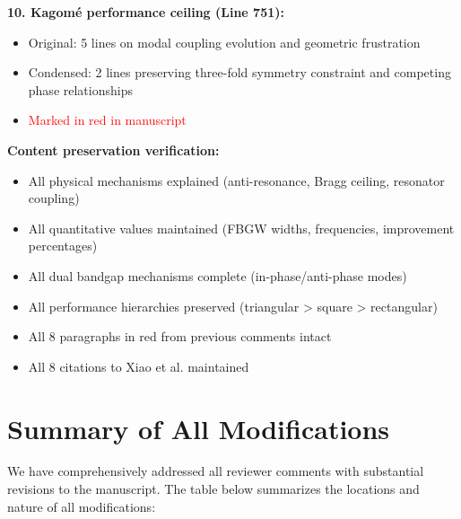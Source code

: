 \documentclass[11pt,a4paper]{article}
\newenvironment{changesbox}{%
    \par\medskip\noindent{\color{changescolor}\rule{\linewidth}{2pt}}\par
    \noindent{\color{changescolor}\bfseries Manuscript Changes}\par\smallskip
}{%
    \par\noindent{\color{changescolor}\rule{\linewidth}{0.5pt}}\medskip
}
\begin{document}
\begin{changesbox}
\textbf{10. Kagomé performance ceiling (Line 751):}
\begin{itemize}
    \item Original: 5 lines on modal coupling evolution and geometric frustration
    \item Condensed: 2 lines preserving three-fold symmetry constraint and competing phase relationships
    \item \textcolor{red}{Marked in red in manuscript}
\end{itemize}

\textbf{Content preservation verification:}
\begin{itemize}
    \item \checkmark All physical mechanisms explained (anti-resonance, Bragg ceiling, resonator coupling)
    \item \checkmark All quantitative values maintained (FBGW widths, frequencies, improvement percentages)
    \item \checkmark All dual bandgap mechanisms complete (in-phase/anti-phase modes)
    \item \checkmark All performance hierarchies preserved (triangular > square > rectangular)
    \item \checkmark All 8 paragraphs in red from previous comments intact
    \item \checkmark All 8 citations to Xiao et al. maintained
\end{itemize}
\end{changesbox}

\newpage

\section*{Summary of All Modifications}

We have comprehensively addressed all reviewer comments with substantial revisions to the manuscript. The table below summarizes the locations and nature of all modifications:
\end{document}
